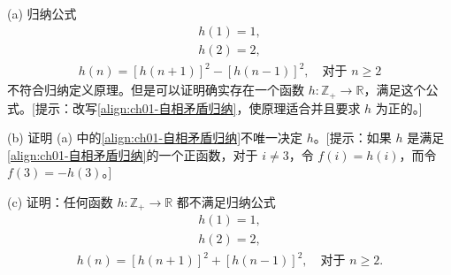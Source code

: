 \documentclass[../../main.tex]{subfiles}
\begin{document}
\begin{exercise}\label{exercise:ch01-可数集-9}
(a) 归纳公式
\begin{align}
h(1) = 1,\label{align:ch01-自相矛盾归纳}
\end{align}
\begin{align*}
h(2) = 2,
\end{align*}
\begin{align*}
h(n) = [h(n+1)]^{2} - [h(n-1)]^{2}, \quad \text{对于 } n \geqslant 2
\end{align*}
不符合归纳定义原理。但是可以证明确实存在一个函数 $h: \mathbb{Z}_{+} \longrightarrow \mathbb{R}$，满足这个公式。[提示：改写\eqref{align:ch01-自相矛盾归纳}，使原理适合并且要求 $h$ 为正的。]

(b) 证明 (a) 中的\eqref{align:ch01-自相矛盾归纳}不唯一决定 $h$。[提示：如果 $h$ 是满足\eqref{align:ch01-自相矛盾归纳}的一个正函数，对于 $i \neq 3$，令 $f(i) = h(i)$，而令 $f(3) = -h(3)$。]

(c) 证明：任何函数 $h: \mathbb{Z}_{+} \longrightarrow \mathbb{R}$ 都不满足归纳公式
\begin{align*}
h(1) = 1,
\end{align*}
\begin{align*}
h(2) = 2,
\end{align*}
\begin{align*}
h(n) = [h(n+1)]^{2} + [h(n-1)]^{2}, \quad \text{对于 } n \geqslant 2.
\end{align*}
\end{exercise}
\end{document}

